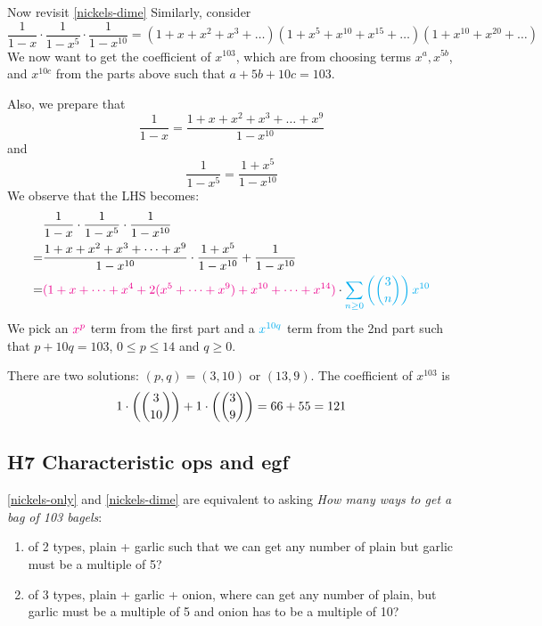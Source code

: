 \documentclass[12pt]{article}
\begin{document}
Now revisit \cref{nickels-dime}
Similarly, consider \[\frac{1}{1-x}\cdot \frac{1}{1-x^5}\cdot \frac{1}{1-x^{10}}= (1+x+x^2+x^3+\dots)(1+x^5+x^{10}+x^{15}+\dots)(1+x^{10}+x^{20}+\dots)\]
We now want to get the coefficient of $x^{103}$, which are from choosing terms $x^{a}, x^{5b}$, and $x^{10c}$ from the parts above such that $a+5b+10c=103$.

Also, we prepare that \[\frac{1}{1-x}=\frac{1+x+x^2+x^3+\dots+x^9}{1-x^{10}}\] and \[\frac{1}{1-x^5}=\frac{1+x^5}{1-x^{10}}\]
We observe that the LHS becomes:
\begin{align*}
    &\frac{1}{1-x}\cdot \frac{1}{1-x^5}\cdot \frac{1}{1-x^{10}}\\
    =& \frac{1+x+x^2+x^3+\dots+x^9}{1-x^{10}}\cdot \frac{1+x^5}{1-x^{10}} + \frac{1}{1-x^{10}}\\
    =& \textcolor{magenta}{(1+x+\dots + x^4 + 2(x^5+\dots+x^9)+x^{10}+\dots + x^{14})} \cdot \textcolor{cyan}{\sum_{n\geq 0}\left({3\choose n}\right)x^{10}}
\end{align*}
We pick an $\textcolor{magenta}{x^p}$ term from the first part and a $\textcolor{cyan}{x^{10q}}$ term from the 2nd part such that $p+10q=103$, $0\leq p\leq 14$ and $q\geq 0$. 

There are two solutions: $(p,q)=(3,10)$ or $(13,9)$. The coefficient of $x^{103}$ is $$1\cdot \left({3\choose 10}\right)+1\cdot \left({3\choose 9}\right)=66+55=121$$

\subsection{H7 Characteristic ops and egf}\hypertarget{characteristic-ops-egf}{}
\cref{nickels-only} and \cref{nickels-dime} are equivalent to asking \textit{How many ways to get a bag of 103 bagels}:
\begin{enumerate}
    \item of 2 types, plain + garlic such that we can get any number of plain but garlic must be a multiple of 5?
    \item of 3 types, plain + garlic + onion, where can get any number of plain, but garlic must be a multiple of 5 and onion has to be a multiple of 10?
\end{enumerate}
\end{document}
